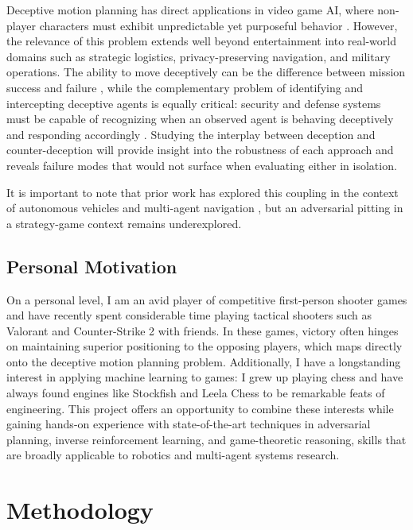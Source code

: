 \documentclass[letterpaper, 10pt, conference]{ieeeconf}
\begin{document}
Deceptive motion planning has direct applications in video game AI, where non-player characters must exhibit unpredictable yet purposeful behavior \cite{tastan2012learning, zeng2023recognition}. However, the relevance of this problem extends well beyond entertainment into real-world domains such as strategic logistics, privacy-preserving navigation, and military operations. The ability to move deceptively can be the difference between mission success and failure \cite{xu2020single, nichols2022adversarial}, while the complementary problem of identifying and intercepting deceptive agents is equally critical: security and defense systems must be capable of recognizing when an observed agent is behaving deceptively and responding accordingly \cite{zeng2023recognition, xu2019goal}. Studying the interplay between deception and counter-deception will provide insight into the robustness of each approach and reveals failure modes that would not surface when evaluating either in isolation.

It is important to note that prior work has explored this coupling in the context of autonomous vehicles \cite{espinoza2022deep} and multi-agent navigation \cite{netter2024motion, lecleach2021lucidgames}, but an adversarial pitting in a strategy-game context remains underexplored.

\subsection{Personal Motivation} \label{sec:motivation/personal}

On a personal level, I am an avid player of competitive first-person shooter games and have recently spent considerable time playing tactical shooters such as Valorant and Counter-Strike 2 with friends. In these games, victory often hinges on maintaining superior positioning to the opposing players, which maps directly onto the deceptive motion planning problem. Additionally, I have a longstanding interest in applying machine learning to games: I grew up playing chess and have always found engines like Stockfish and Leela Chess to be remarkable feats of engineering. This project offers an opportunity to combine these interests while gaining hands-on experience with state-of-the-art techniques in adversarial planning, inverse reinforcement learning, and game-theoretic reasoning, skills that are broadly applicable to robotics and multi-agent systems research.

\section{Methodology} \label{sec:methodology}
\end{document}
